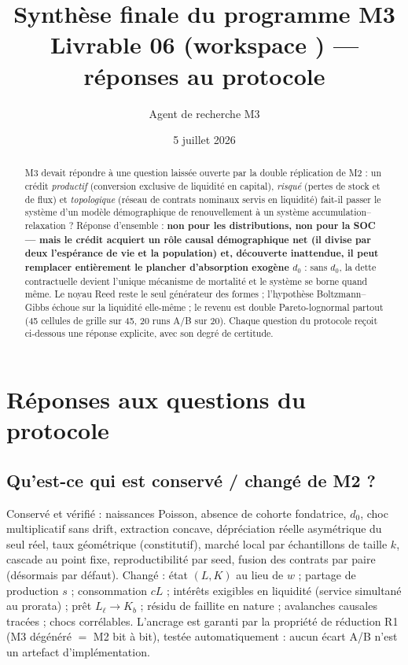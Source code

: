 \documentclass[11pt,a4paper]{article}
\title{Synthèse finale du programme M3\\
\large Livrable 06 (workspace \code{m3\_credit\_soc}) — réponses au protocole}
\author{Agent de recherche M3}
\date{5 juillet 2026}
\begin{document}
\maketitle

\begin{abstract}
M3 devait répondre à une question laissée ouverte par la double réplication
de M2 : un crédit \emph{productif} (conversion exclusive de liquidité en
capital), \emph{risqué} (pertes de stock et de flux) et \emph{topologique}
(réseau de contrats nominaux servis en liquidité) fait-il passer le système
d'un modèle démographique de renouvellement à un système
accumulation--relaxation ? Réponse d'ensemble : \textbf{non pour les
distributions, non pour la SOC — mais le crédit acquiert un rôle causal
démographique net (il divise par deux l'espérance de vie et la population)
et, découverte inattendue, il peut remplacer entièrement le plancher
d'absorption exogène $d_0$} : sans $d_0$, la dette contractuelle devient
l'unique mécanisme de mortalité et le système se borne quand même. Le
noyau Reed reste le seul générateur des formes ; l'hypothèse
Boltzmann--Gibbs échoue sur la liquidité elle-même ; le revenu est double
Pareto-lognormal partout (45 cellules de grille sur 45, 20 runs A/B sur
20). Chaque question du protocole reçoit ci-dessous une réponse explicite,
avec son degré de certitude.
\end{abstract}

\section{Réponses aux questions du protocole}

\subsection{Qu'est-ce qui est conservé / changé de M2 ?}
Conservé et vérifié : naissances Poisson, absence de cohorte fondatrice,
$d_0$, choc multiplicatif sans drift, extraction concave, dépréciation
réelle asymétrique du seul réel, taux géométrique (constitutif), marché
local par échantillons de taille $k$, cascade au point fixe,
reproductibilité par seed, fusion des contrats par paire (désormais par
défaut). Changé : état $(L, K)$ au lieu de $w$ ; partage de production
$s$ ; consommation $cL$ ; intérêts exigibles en liquidité (service
simultané au prorata) ; prêt $L_\ell \to K_b$ ; résidu de faillite en
nature ; avalanches causales tracées ; chocs corrélables. L'ancrage est
garanti par la propriété de réduction R1 (M3 dégénéré $=$ M2 bit à bit),
testée automatiquement : aucun écart A/B n'est un artefact
d'implémentation.
\end{document}
